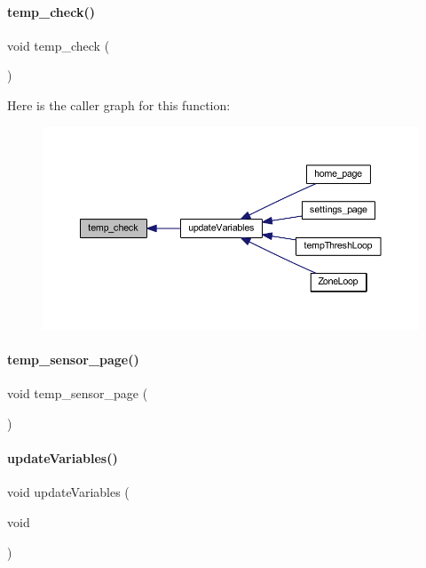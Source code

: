 \paragraph{temp\+\_\+check()}
{\footnotesize\ttfamily void temp\+\_\+check (\begin{DoxyParamCaption}{ }\end{DoxyParamCaption})}

Here is the caller graph for this function\+:
\nopagebreak
\begin{figure}[H]
\begin{center}
\leavevmode
\includegraphics[width=350pt]{a00038_a4b26f408a34637904178d99db3f715f7_icgraph}
\end{center}
\end{figure}
\mbox{\label{a00038_a257b3d360a2b1086e490c28e03133cb9}} 
\paragraph{temp\+\_\+sensor\+\_\+page()}
{\footnotesize\ttfamily void temp\+\_\+sensor\+\_\+page (\begin{DoxyParamCaption}{ }\end{DoxyParamCaption})}

\mbox{\label{a00038_a58a141413d55108017a06b4a4290b956}} 
\paragraph{update\+Variables()}
{\footnotesize\ttfamily void update\+Variables (\begin{DoxyParamCaption}\item[{void}]{ }\end{DoxyParamCaption})}

